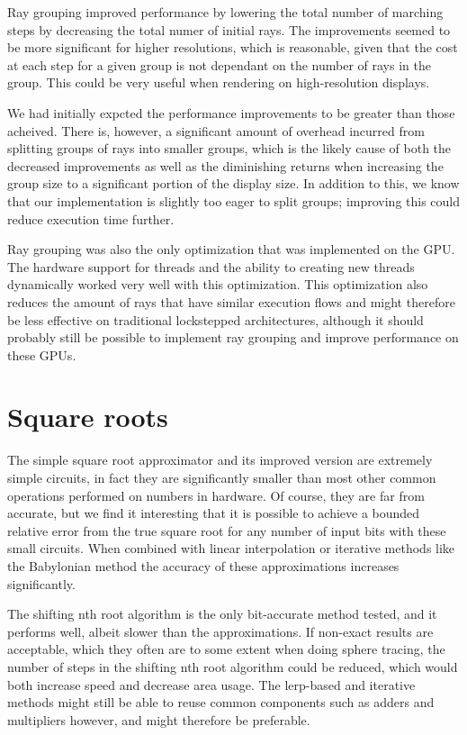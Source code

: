 			Ray grouping improved performance by lowering the total number of
			marching steps by decreasing the total numer of initial rays. The
			improvements seemed to be more significant for higher resolutions,
			which is reasonable, given that the cost at each step for a given
			group is not dependant on the number of rays in the group. This 
			could be very useful when rendering on high-resolution displays.
			
			We had initially expcted the performance improvements to be greater
			than those acheived. There is, however, a significant amount of
			overhead incurred from splitting groups of rays into smaller
			groups, which is the likely cause of both the decreased
			improvements as well as the diminishing returns when increasing the
			group size to a significant portion of the display size. In
			addition to this, we know that our implementation is slightly too
			eager to split groups; improving this could reduce execution time
			further.

			Ray grouping was also the only optimization that was implemented on
			the GPU. The hardware support for threads and the ability to
			creating new threads dynamically worked very well with this
			optimization. This optimization also reduces the amount of rays
			that have similar execution flows and might therefore be less
			effective on traditional lockstepped architectures, although it
			should probably still be possible to implement ray grouping and
			improve performance on these GPUs.

	\section{Square roots}

		The simple square root approximator and its improved version are
		extremely simple circuits, in fact they are significantly smaller than
		most other common operations performed on numbers in hardware. Of
		course, they are far from accurate, but we find it interesting that it
		is possible to achieve a bounded relative error from the true square
		root for any number of input bits with these small circuits. When
		combined with linear interpolation or iterative methods like the
		Babylonian method the accuracy of these approximations increases
		significantly.
		
		The shifting nth root algorithm is the only bit-accurate method tested,
		and it performs well, albeit slower than the approximations. If
		non-exact results are acceptable, which they often are to some extent
		when doing sphere tracing, the number of steps in the shifting nth root
		algorithm could be reduced, which would both increase speed and
		decrease area usage. The lerp-based and iterative methods might still
		be able to reuse common components such as adders and multipliers
		however, and might therefore be preferable.
		
